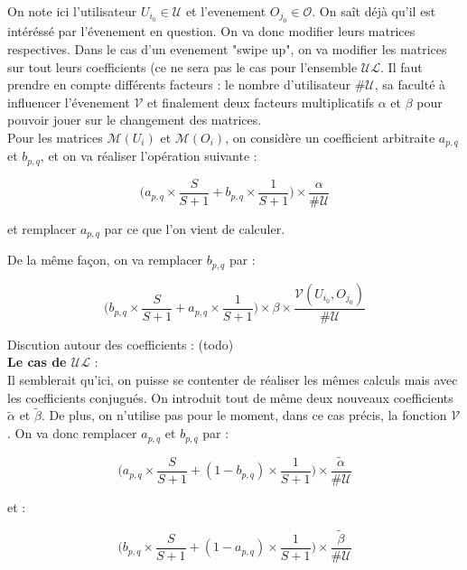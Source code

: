 \documentclass[11pt, oneside]{article}
\begin{document}
On note ici l'utilisateur $U_{i_0} \in \mathcal{U}$ et l'evenement $O_{j_0} \in \mathcal{O}$. On saît déjà qu'il est intéréssé par l'évenement en question. On va donc modifier leurs matrices respectives. Dans le cas d'un evenement "swipe up", on va modifier les matrices sur tout leurs coefficients (ce ne sera pas le cas pour l'ensemble $\mathcal{UL}$. Il faut prendre en compte différents facteurs : le nombre d'utilisateur $\#\mathcal{U}$, sa faculté à influencer l'évenement $\mathcal{V}$ et finalement deux facteurs multiplicatifs $\alpha$ et $\beta$ pour pouvoir jouer sur le changement des matrices. \\ 

Pour les matrices $\mathcal{M} (U_i)$ et $\mathcal{M} (O_i)$, on considère un coefficient arbitraite $a_{p,q}$ et $b_{p,q}$, et on va réaliser l'opération suivante : 
\begin{center}
\[
 \big( a_{p,q} \times \frac{S}{S+1} + b_{p,q}\times \frac{1}{S+1} \big) \times \frac{\alpha}{\#\mathcal{U}}
\]
\end{center}
et remplacer $a_{p,q}$ par ce que l'on vient de calculer. 

De la même façon, on va remplacer $b_{p,q}$ par : 
\begin{center}
\[
 \big( b_{p,q} \times \frac{S}{S+1} + a_{p,q}\times \frac{1}{S+1} \big) \times \beta \times \frac{\mathcal{V}(U_{i_0},O_{j_0})}{\#\mathcal{U}}
\]
\end{center}

Discution autour des coefficients : (todo) \\
\newpage
\textbf{Le cas de $\mathcal{UL}$} : \\

Il semblerait qu'ici, on puisse se contenter de réaliser les mêmes calculs mais avec les coefficients conjugués. On introduit tout de même deux nouveaux coefficients $\tilde{\alpha}$ et $\tilde{\beta}$. De plus, on n'utilise pas pour le moment, dans ce cas précis, la fonction $\mathcal{V}$. On va donc remplacer $a_{p,q}$ et $b_{p,q}$ par : 
\begin{center}
\[
 \big( a_{p,q} \times \frac{S}{S+1} + (1 - b_{p,q})\times \frac{1}{S+1} \big) \times \frac{\tilde{\alpha}}{\#\mathcal{U}}
\]
\end{center}
et : 
\begin{center}
\[
 \big( b_{p,q} \times \frac{S}{S+1} + (1 - a_{p,q})\times \frac{1}{S+1} \big) \times \frac{\mathcal{\tilde{\beta}}}{\#\mathcal{U}}
\]
\end{center}
\end{document}
